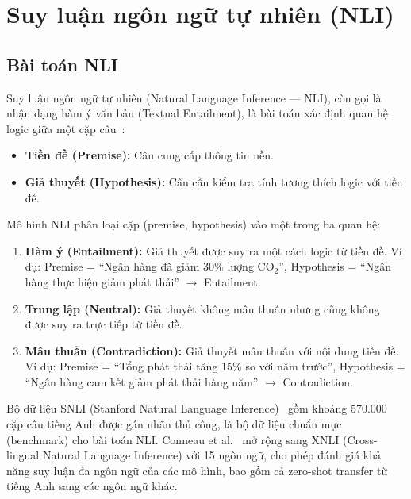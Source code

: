 \section{Suy luận ngôn ngữ tự nhiên (NLI)}
\label{sec:nli}

\subsection{Bài toán NLI}
\label{subsec:nli_task}

Suy luận ngôn ngữ tự nhiên (Natural Language Inference --- NLI), còn gọi là nhận dạng hàm ý văn bản (Textual Entailment), là bài toán xác định quan hệ logic giữa một cặp câu~\cite{bowman2015large}:

\begin{itemize}
    \item \textbf{Tiền đề (Premise):} Câu cung cấp thông tin nền.
    \item \textbf{Giả thuyết (Hypothesis):} Câu cần kiểm tra tính tương thích logic với tiền đề.
\end{itemize}

\noindent Mô hình NLI phân loại cặp (premise, hypothesis) vào một trong ba quan hệ:

\begin{enumerate}
    \item \textbf{Hàm ý (Entailment):} Giả thuyết được suy ra một cách logic từ tiền đề. Ví dụ: Premise = ``Ngân hàng đã giảm 30\% lượng CO$_2$'', Hypothesis = ``Ngân hàng thực hiện giảm phát thải'' $\rightarrow$ Entailment.
    \item \textbf{Trung lập (Neutral):} Giả thuyết không mâu thuẫn nhưng cũng không được suy ra trực tiếp từ tiền đề.
    \item \textbf{Mâu thuẫn (Contradiction):} Giả thuyết mâu thuẫn với nội dung tiền đề. Ví dụ: Premise = ``Tổng phát thải tăng 15\% so với năm trước'', Hypothesis = ``Ngân hàng cam kết giảm phát thải hàng năm'' $\rightarrow$ Contradiction.
\end{enumerate}

Bộ dữ liệu SNLI (Stanford Natural Language Inference)~\cite{bowman2015large} gồm khoảng 570.000 cặp câu tiếng Anh được gán nhãn thủ công, là bộ dữ liệu chuẩn mực (benchmark) cho bài toán NLI. Conneau et al.~\cite{conneau2018xnli} mở rộng sang XNLI (Cross-lingual Natural Language Inference) với 15 ngôn ngữ, cho phép đánh giá khả năng suy luận đa ngôn ngữ của các mô hình, bao gồm cả zero-shot transfer từ tiếng Anh sang các ngôn ngữ khác.

